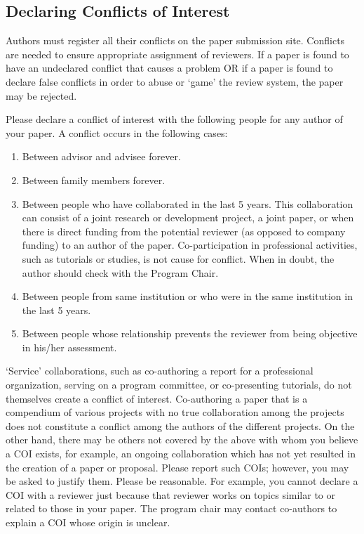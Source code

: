 \documentclass[conference]{IEEEtran}
\begin{document}
\subsection{Declaring Conflicts of Interest}

Authors must register all their conflicts on the paper submission
site. Conflicts are needed to ensure appropriate assignment of
reviewers. If a paper is found to have an undeclared conflict that
causes a problem OR if a paper is found to declare false conflicts in
order to abuse or `game' the review system, the paper may be rejected. 

Please declare a conflict of interest with the following people for any author of your paper.
A conflict occurs in the following cases:
\begin{enumerate}
\item Between advisor and advisee forever. 
\item Between family members forever. 
\item Between people who have collaborated in the last 5 years. This
  collaboration can consist of a joint research or development
  project, a joint paper, or when there is direct funding from the
  potential reviewer (as opposed to company funding) to an author of
  the paper. Co-participation in professional activities, such as
  tutorials or studies, is not cause for conflict. When in doubt, the
  author should check with the Program Chair. 
\item Between people from same institution or who were in the same
  institution in the last 5 years.  
\item Between people whose relationship prevents the reviewer from
  being objective in his/her assessment. 
\end{enumerate}

`Service' collaborations, such as co-authoring a report for a
professional organization, serving on a program committee, or
co-presenting tutorials, do not themselves create a conflict of
interest. Co-authoring a paper that is a compendium of various
projects with no true collaboration among the projects does not
constitute a conflict among the authors of the different projects. On
the other hand, there may be others not covered by the above with whom
you believe a COI exists, for example, an ongoing collaboration which
has not yet resulted in the creation of a paper or proposal. Please
report such COIs; however, you may be asked to justify them. Please be
reasonable. For example, you cannot declare a COI with a reviewer just
because that reviewer works on topics similar to or related to those
in your paper.  The program chair may contact co-authors to explain a COI
whose origin is unclear. 
\end{document}
